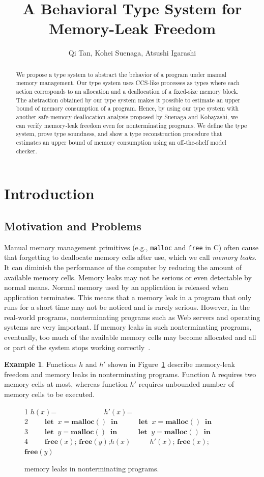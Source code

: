 \documentclass[english]{jssst_ppl} %
\title{A Behavioral Type System for \\ Memory-Leak Freedom}
\author{Qi Tan, Kohei Suenaga, Atsushi Igarashi}
\newcommand\LET{\mathbf{let}\;}
\newcommand\IN{\mathbf{in}\;}
\newcommand\Rtab{\; \; \; \;}
\newcommand\MALLOC{\mathbf{malloc()}\;}
\newcommand\Free{\mathbf{free}}
\newcommand\Cirx{(x)}
\newcommand\dtb{\;\;\ \;\;\ \;\;\ \;\;\  }
\theoremstyle{definition}
\newtheorem{exmp}{Example}[section]
\begin{document}
\maketitle
\begin{abstract}
We propose a type system to abstract the behavior of a program under manual memory management. Our type system uses CCS-like processes as types where each action corresponds to an allocation and a deallocation of a fixed-size memory block. The abstraction obtained by our type system makes it possible to estimate an upper bound of memory consumption of a program. Hence, by using our type system with another safe-memory-deallocation analysis proposed by Suenaga and Kobayashi, we can verify memory-leak freedom even for nonterminating programs.  We define the type system, prove type soundness, and show a type reconstruction procedure that estimates an upper bound of memory consumption using an off-the-shelf model checker.
\end{abstract}

\section{Introduction}
\subsection{Motivation and Problems}
Manual memory management primitives (e.g., \texttt{malloc} and \texttt{free} in C) often cause that forgetting to deallocate memory cells after use, which we call \emph{memory leaks}. It can diminish the performance of the computer by reducing the amount of available memory cells. Memory leaks may not be serious or even detectable by normal means. Normal memory used by an application is released when application terminates. This means that a memory leak in a program that only runs for a short time may not be noticed and is rarely serious. However, in the real-world programs, nonterminating programs such as Web servers and operating systems are very important. If memory leaks in such nonterminating programs, eventually, too much of the available memory cells may become allocated and all or part of the system stops working correctly~\cite{wiki:xxx}.

\begin{exmp}\label{ex:ex1}
Functions $h$ and $h'$ shown in Figure~\ref{ex:np} describe memory-leak freedom and memory leaks in nonterminating programs. Function $h$ requires two memory cells at most, whereas function $h'$ requires unbounded number of memory cells to be executed.
\begin{figure}[h]
1  \Rtab $h(x)$= \dtb \dtb\dtb\Rtab$h'(x)$= \\
2  \dtb $\LET \; x = \MALLOC  \; \IN$ \dtb \Rtab$\LET \; x = \MALLOC  \; \IN$\\
3  \dtb $\LET \; y = \MALLOC  \; \IN$ \dtb \Rtab$\LET \; y = \MALLOC  \; \IN$\\
4  \dtb $\Free(x)$; $\Free(y) $;\;$h(x)$ \dtb \Rtab$h'(x)$; $\Free\Cirx$; \ $\Free(y)$
\caption{memory leaks in nonterminating programs.}
\label{ex:np}
\end{figure}
\end{exmp}
\end{document}
